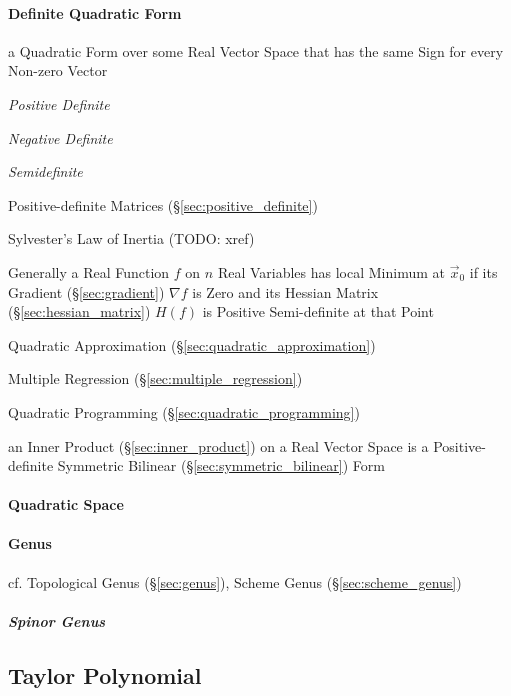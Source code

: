 \paragraph{Definite Quadratic Form}\label{sec:definite_quadratic}\hfill

a Quadratic Form over some Real Vector Space that has the same Sign
for every Non-zero Vector

\emph{Positive Definite}

\emph{Negative Definite}

\emph{Semidefinite}

\fist Positive-definite Matrices (\S\ref{sec:positive_definite})

\fist Sylvester's Law of Inertia (TODO: xref)

Generally a Real Function $f$ on $n$ Real Variables has local Minimum at
$\vec{x}_0$ if its Gradient (\S\ref{sec:gradient}) $\nabla f$ is Zero and its
Hessian Matrix (\S\ref{sec:hessian_matrix}) $H(f)$ is Positive Semi-definite at
that Point

\fist Quadratic Approximation (\S\ref{sec:quadratic_approximation})

\fist Multiple Regression (\S\ref{sec:multiple_regression})

\fist Quadratic Programming (\S\ref{sec:quadratic_programming})

an Inner Product (\S\ref{sec:inner_product}) on a Real Vector Space is
a Positive-definite Symmetric Bilinear
(\S\ref{sec:symmetric_bilinear}) Form



\paragraph{Quadratic Space}\label{sec:quadratic_space}\hfill

\paragraph{Genus}\label{sec:quadratic_genus}\hfill

\fist cf. Topological Genus (\S\ref{sec:genus}), Scheme Genus
(\S\ref{sec:scheme_genus})



\subparagraph{Spinor Genus}\label{sec:spinor_genus}\hfill



\subsection{Taylor Polynomial}\label{sec:taylor_polynomial}

